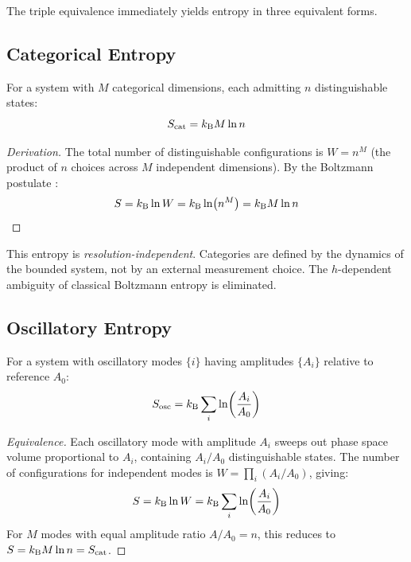 The triple equivalence immediately yields entropy in three equivalent forms.

\subsection{Categorical Entropy}

\begin{definition}
\label{def:cat_entropy}
For a system with $M$ categorical dimensions, each admitting $n$ distinguishable states:
\begin{equation}
    S_{\mathrm{cat}} = k_{\mathrm{B}} M \ln n
\end{equation}
\end{definition}

\begin{proof}[Derivation]
The total number of distinguishable configurations is $W = n^M$ (the product of $n$ choices across $M$ independent dimensions). By the Boltzmann postulate \cite{boltzmann1877}:
\begin{equation}
    S = k_{\mathrm{B}} \ln W = k_{\mathrm{B}} \ln(n^M) = k_{\mathrm{B}} M \ln n
\end{equation}
\end{proof}

\begin{remark}
This entropy is \emph{resolution-independent}. Categories are defined by the dynamics of the bounded system, not by an external measurement choice. The $h$-dependent ambiguity of classical Boltzmann entropy is eliminated.
\end{remark}

\subsection{Oscillatory Entropy}

\begin{definition}
For a system with oscillatory modes $\{i\}$ having amplitudes $\{A_i\}$ relative to reference $A_0$:
\begin{equation}
    S_{\mathrm{osc}} = k_{\mathrm{B}} \sum_i \ln\!\left(\frac{A_i}{A_0}\right)
\end{equation}
\end{definition}

\begin{proof}[Equivalence]
Each oscillatory mode with amplitude $A_i$ sweeps out phase space volume proportional to $A_i$, containing $A_i/A_0$ distinguishable states. The number of configurations for independent modes is $W = \prod_i (A_i/A_0)$, giving:
\begin{equation}
    S = k_{\mathrm{B}} \ln W = k_{\mathrm{B}} \sum_i \ln\!\left(\frac{A_i}{A_0}\right)
\end{equation}
For $M$ modes with equal amplitude ratio $A/A_0 = n$, this reduces to $S = k_{\mathrm{B}} M \ln n = S_{\mathrm{cat}}$.
\end{proof}

